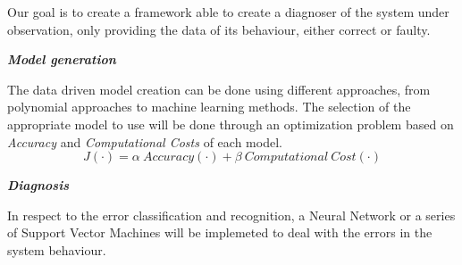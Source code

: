 \documentclass[a0paper]{tikzposter}
\begin{document}
		


	{
		Our goal is to create a framework able to create a diagnoser of the
		system under observation, only providing the data of its behaviour,
		either correct or faulty. \\
		
		\begin{minipage}[t]{0.43\textwidth}
			\begin{center}
				\textbf{\textit{Model generation}}
			\end{center}
			The data driven model creation can be done using different
			approaches, from polynomial approaches to machine learning methods.
			The selection of the appropriate model to use will be done through
			an optimization problem based on \emph{Accuracy} and
			\emph{Computational Costs} of each model.
			$$ J(\cdot) = \alpha\ Accuracy(\cdot) + \beta\ Computational\ Cost(\cdot) $$
		\end{minipage}
		\hspace{15mm}
		\begin{minipage}[t]{0.43\textwidth}
			\begin{center}
				\textbf{\textit{Diagnosis}}
			\end{center}
			In respect to the error classification and recognition, a Neural
			Network or a series of Support Vector Machines will be implemeted to
			deal with the errors in the system behaviour.
		\end{minipage}
	}
\end{document}
